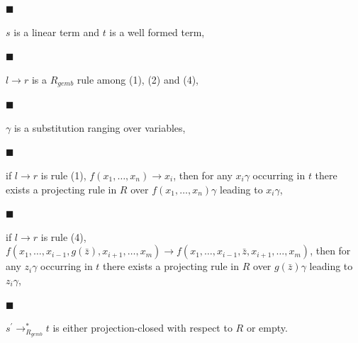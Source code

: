 \documentclass[10pt,a4paper]{amsart}
\begin{document}
\par\noindent  $\blacksquare$ 
 
$s$ is a linear term and $t$ is a well formed term,\par
 
 
 
\par\noindent  $\blacksquare$ 
 
$l\rightarrow r$ is a $R_{gemb}$ rule among (1), (2) and (4),\par
 
 
 
\par\noindent  $\blacksquare$ 
 
$\gamma$ is a substitution ranging over variables,\par
 
 
 
\par\noindent  $\blacksquare$ 
 
if $l\rightarrow r$ is rule (1), $f(x_{1},\ldots,x_{n})\rightarrow x_{i}$, then for any $x_{i}\gamma$ occurring in $t$ there exists a projecting rule in $R$ over $f(x_{1},\ldots,x_{n})\gamma$ leading to $x_{i}\gamma$,\par
 
 
 
\par\noindent  $\blacksquare$ 
 
if $l\rightarrow r$ is rule (4), $f(x_{1},\dots,x_{i-1},g(\bar{z}),x_{i+1},\dots,x_{m})\rightarrow f(x_{1},\dots%
,x_{i-1},\bar{z},x_{i+1},\dots,x_{m})$, then for any $z_{i}\gamma$ occurring in $t$ there exists a projecting rule in $R$ over $g(\bar{z})\gamma$ leading to $z_{i}\gamma$,\par
 
 
 
\par\noindent  $\blacksquare$ 
 
$s^{\prime}\rightarrow_{R_{gemb}}^{*}t$ is either projection-closed with respect to $R$ or empty.\par
 
 
  
 
 
 
\end{document}
